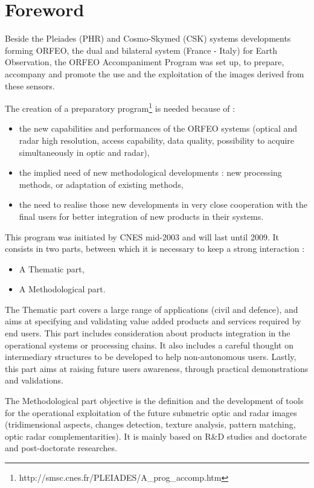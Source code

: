 \chapter*{Foreword}
\noindent


Beside the Pleiades (PHR) and Cosmo-Skymed (CSK) systems developments forming ORFEO, the dual and bilateral system (France - Italy) for Earth Observation, the ORFEO Accompaniment Program was set up, to prepare, accompany and promote the use and the exploitation of the images derived from these sensors.

The creation of a preparatory program\footnote{http://smsc.cnes.fr/PLEIADES/A\_prog\_accomp.htm} is needed because of :
\begin{itemize}
\item the new capabilities and performances of the ORFEO systems (optical and radar high resolution, access capability, data quality, possibility to acquire simultaneously in optic and radar),
\item the implied need of new methodological developments : new processing methods, or adaptation of existing methods,
\item the need to realise those new developments in very close
  cooperation with the final users for better integration of new
  products in their systems.

\end{itemize}

This program was initiated by CNES mid-2003 and will last until 2009.
It consists in two parts, between which it is necessary to keep a strong interaction :
\begin{itemize}
\item A Thematic part,
\item A Methodological part.
\end{itemize}

The Thematic part covers a large range of applications (civil and
defence), and aims at specifying and validating value added
products and services required by end users. This part includes
consideration about products integration in the operational systems or
processing chains. It also includes a careful thought on intermediary
structures to be developed to help non-autonomous users. Lastly, this part aims at raising future users awareness, through practical demonstrations and validations.

The Methodological part objective is the definition and the
development of tools for the operational exploitation of the future
submetric optic and radar images (tridimensional aspects, changes
detection, texture analysis, pattern matching, optic radar
complementarities). It is mainly based on R\&D studies and doctorate
and post-doctorate researches.

